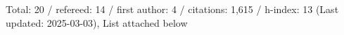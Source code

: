 Total: 20 / refereed: 14 / first author: 4 / citations: 1,615 / h-index: 13 (Last updated: 2025-03-03), List attached below